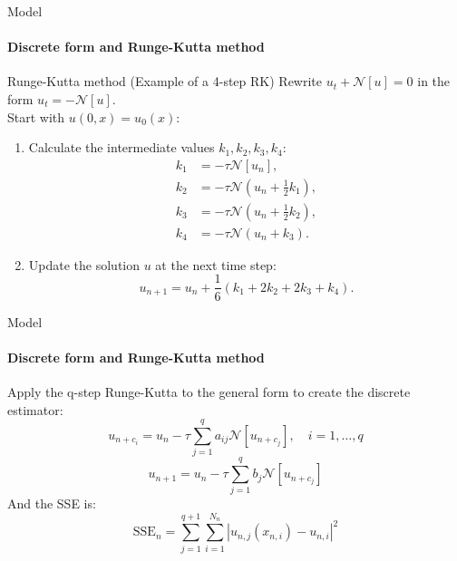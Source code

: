     \begin{frame}{Model}
    \framesubtitle{Discrete form and Runge-Kutta method}
        \begin{block}{Runge-Kutta method (Example of a 4-step RK)}
        Rewrite \( u_t + \mathcal{N}[u] = 0 \) in the form \( u_t = -\mathcal{N}[u] \).\\
        Start with \( u(0, x) = u_0(x) \):
        \begin{enumerate}
            \item Calculate the intermediate values \( k_1, k_2, k_3, k_4 \):
            \begin{align*}
                k_1 &= -\tau \mathcal{N}[u_n], \\
                k_2 &= -\tau \mathcal{N} \left( u_n + \frac{1}{2} k_1 \right), \\
                k_3 &= -\tau \mathcal{N} \left( u_n + \frac{1}{2} k_2 \right), \\
                k_4 &= -\tau \mathcal{N} \left( u_n + k_3 \right).
            \end{align*}
    
            \item Update the solution \( u \) at the next time step:
            \[
            u_{n+1} = u_n + \frac{1}{6} (k_1 + 2k_2 + 2k_3 + k_4).
            \]
        \end{enumerate}
        \end{block}
    \end{frame}
    
    \begin{frame}{Model}
    \framesubtitle{Discrete form and Runge-Kutta method}
        Apply the q-step Runge-Kutta to the general form to create the discrete estimator:
        \begin{equation}
        u_{n+c_i} = u_n - \tau \sum_{j=1}^q a_{ij} \mathcal{N}[u_{n+c_j}], \quad i = 1, \ldots, q
        \end{equation}
        \begin{equation}
        u_{n+1} = u_n - \tau \sum_{j=1}^q b_j \mathcal{N}[u_{n+c_j}]
        \end{equation}
        And the SSE is:
        \begin{equation}
        \text{SSE}_n = \sum_{j=1}^{q+1} \sum_{i=1}^{N_n} \left| u_{n,j}(x_{n,i}) - u_{n,i} \right|^2
        \end{equation}
    \end{frame}    
    
